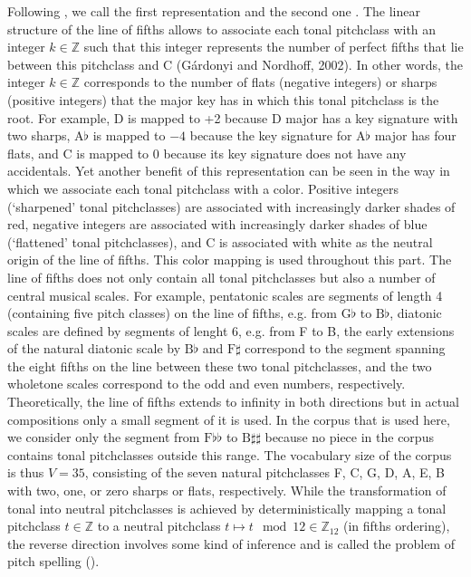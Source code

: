\documentclass[letterpaper,10pt,english]{sphinxmanual}
\begin{document}
Following , we call the first representation  and the
second one . The linear structure of the line of fifths allows to associate each
tonal pitch\sphinxhyphen{}class with an integer \(k \in \mathbb{Z}\) such that this integer represents the number of perfect
fifths that lie between this pitch\sphinxhyphen{}class and C (Gárdonyi and Nordhoff, 2002). In other words,
the integer \(k \in \mathbb{Z}\) corresponds to the number of flats (negative integers) or sharps (positive
integers) that the major key has in which this tonal pitch\sphinxhyphen{}class is the root. For example,
D is mapped to +2 because D major has a key signature with two sharps, \(\text{A}\flat\) is mapped
to \(-4\) because the key signature for \(\text{A}\flat\) major has four flats, and C is mapped to 0 because
its key signature does not have any accidentals. Yet another benefit of this representation
can be seen in the way in which we associate each tonal pitch\sphinxhyphen{}class with a color. Positive
integers (‘sharpened’ tonal pitch\sphinxhyphen{}classes) are associated with increasingly darker shades of
red, negative integers are associated with increasingly darker shades of blue (‘flattened’ tonal
pitch\sphinxhyphen{}classes), and C is associated with white as the neutral origin of the line of fifths. This
color mapping is used throughout this part. The line of fifths does not only contain all tonal
pitch\sphinxhyphen{}classes but also a number of central musical scales. For example, pentatonic scales are
segments of length 4 (containing five pitch classes) on the line of fifths, e.g. from \(\text{G}\flat\) to \(\text{B}\flat\),
diatonic scales are defined by segments of lenght 6, e.g. from F to B, the early extensions of
the natural diatonic scale by \(\text{B}\flat\) and \(\text{F}\sharp\)
correspond to the segment spanning the eight fifths on
the line between these two tonal pitch\sphinxhyphen{}classes, and the two whole\sphinxhyphen{}tone scales correspond to
the odd and even numbers, respectively. Theoretically, the line of fifths extends to infinity in
both directions but in actual compositions only a small segment of it is used. In the corpus
that is used here, we consider only the segment from \(\text{F}\flat\flat\) to \(\text{B}\sharp\sharp\)
because no piece in the corpus
contains tonal pitch\sphinxhyphen{}classes outside this range. The vocabulary size of the corpus is thus
\(V = 35\), consisting of the seven natural pitch\sphinxhyphen{}classes F, C, G, D, A, E, B with two, one, or zero
sharps or flats, respectively. While the transformation of tonal into neutral pitch\sphinxhyphen{}classes is
achieved by deterministically mapping a tonal pitch\sphinxhyphen{}class \(t \in \mathbb{Z}\) to a neutral pitch\sphinxhyphen{}class
\(t \mapsto t \mod 12 \in \mathbb{Z}_{12}\) (in fifths ordering), the reverse direction involves some kind of inference and is
called the problem of pitch spelling ().
\end{document}
